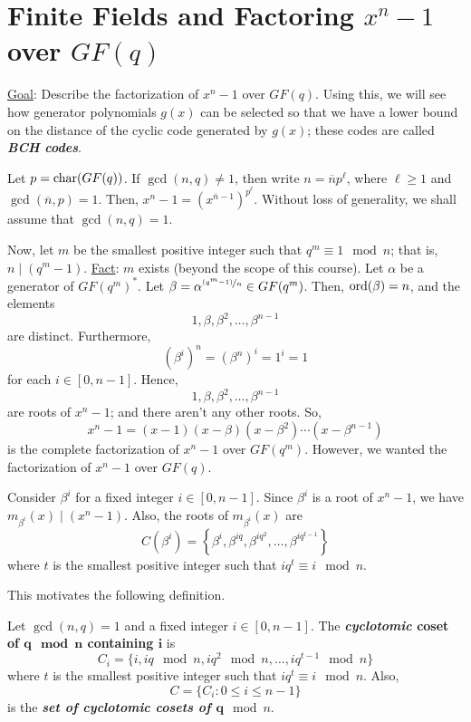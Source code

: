 \section{Finite Fields and Factoring $ x^n-1 $ over $ GF(q) $}
\underline{Goal}: Describe the factorization of
$ x^n-1 $ over $ GF(q) $. Using this, we will see how
generator polynomials $ g(x) $ can be selected so that we have a
lower bound on the distance of the cyclic code
generated by $ g(x) $; these codes are called \textbf{\emph{BCH codes}}.

Let $ p=\operatorname{char}(GF(q)) $. If $ \gcd(n,q)\neq 1 $, then
write $ n=\overline{n}p^\ell $, where $ \ell\geqslant 1 $
and $ \gcd(\overline{n},p)=1 $. Then, $ x^n-1=(x^{\overline{n}-1})^{p^\ell} $.
Without loss of generality, we shall assume that $ \gcd(n,q)=1 $.

Now, let $ m $ be the smallest positive integer such that
$ q^m\equiv 1\mod n $; that is, $ n\mid (q^m-1) $.
\underline{Fact}: $ m $ exists (beyond the scope of this course).
Let $ \alpha $ be a generator of $ GF(q^m)^* $.
Let $ \beta=\alpha^{\nicefrac{(q^m-1)}{n}} \in GF(q^m) $.
Then, $ \operatorname{ord}(\beta)=n $, and the elements
\[ 1,\beta,\beta^2,\ldots ,\beta^{n-1} \]
are distinct. Furthermore,
\[ (\beta^i)^n=(\beta^n)^i=1^i=1 \]
for each $ i\in[0,n-1] $. Hence,
\[ 1,\beta,\beta^2,\ldots ,\beta^{n-1} \]
are roots of $ x^n-1 $; and there aren't any other roots. So,
\[ x^n-1=(x-1)(x-\beta)(x-\beta^2)\cdots(x-\beta^{n-1}) \]
is the complete factorization of $ x^n-1 $ over $ GF(q^m) $.
However, we wanted the factorization of $ x^n-1 $ over $ GF(q) $.

Consider $ \beta^i $ for a fixed integer $ i\in[0,n-1] $. Since
$ \beta^i $ is a root of $ x^n-1 $, we have $ m_{\beta^i}(x)\mid (x^n-1) $.
Also, the roots of $ m_{\beta^i}(x) $ are
\[ C(\beta^i)=\left\{ \beta^i,\beta^{iq},\beta^{iq^2},\ldots ,\beta^{iq^{t-1}}\right\} \]
where $ t $ is the smallest positive integer such that $ iq^t\equiv i\mod n $.

This motivates the following definition.
\begin{defbox}
    \begin{definition}
        Let $ \gcd(n,q)=1 $ and a fixed integer $ i\in[0,n-1] $. The
        \textbf{\emph{cyclotomic} coset of $\bm{q\mod n}$
            containing $\bm{i}$} is
        \[ C_i=\{i,iq\mod n,iq^2\mod n,\ldots ,iq^{t-1}\mod n\} \]
        where $ t $ is the smallest positive integer such that $ iq^t\equiv i\mod n $.
        Also,
        \[ C=\{C_i:0\leqslant i\leqslant n-1\} \]
        is the \textbf{\emph{set of cyclotomic cosets of $\bm{q}\mod n$}}.
    \end{definition}
\end{defbox}

